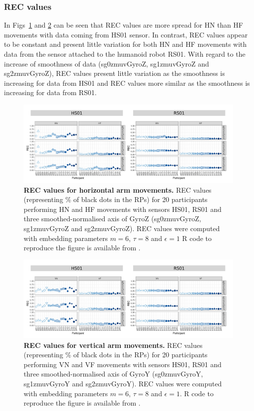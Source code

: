 \subsubsection*{REC values}
In Figs~\ref{fig:rec_aH} and \ref{fig:rec_aV} can be seen that REC values 
are more spread for HN than HF movements with data coming from HS01 sensor. 
In contrast, REC values appear to be constant and present 
little variation for both HN and HF movements 
with data from the sensor attached to the humanoid robot RS01.
With regard to the increase of smoothness of data (sg0zmuvGyroZ, sg1zmuvGyroZ and sg2zmuvGyroZ), 
REC values present little variation as the smoothness is increasing for data 
from HS01 and REC values more similar as the smoothness is increasing for data from RS01.
\begin{figure}[!h]
\centering
\includegraphics[width=1.0\textwidth]{rec_aH}
    \caption{
	{\bf REC values for horizontal arm movements.}	
	REC values (representing \% of black dots in the RPs) for 
	20 participants performing HN and HF movements
	with sensors HS01, RS01 and three smoothed-normalised axis 
	of GyroZ (sg0zmuvGyroZ, sg1zmuvGyroZ and sg2zmuvGyroZ).
	REC values were computed with 
	embedding parameters $m=6$, $\tau=8$ and $\epsilon=1$
	R code to reproduce the figure is available from \cite{hwum2018}.
        }
    \label{fig:rec_aH}
\end{figure}
\begin{figure}[!h]
\centering
\includegraphics[width=1.0\textwidth]{rec_aV}
    \caption{
	{\bf REC values for vertical arm movements.}	
	REC values (representing \% of black dots in the RPs) for 
	20 participants performing VN and VF movements
	with sensors HS01, RS01 and three smoothed-normalised axis 
	of GyroY (sg0zmuvGyroY, sg1zmuvGyroY and sg2zmuvGyroY).
	REC values were computed with 
	embedding parameters $m=6$, $\tau=8$ and $\epsilon=1$.
	R code to reproduce the figure is available from \cite{hwum2018}.
        }
    \label{fig:rec_aV}
\end{figure}
